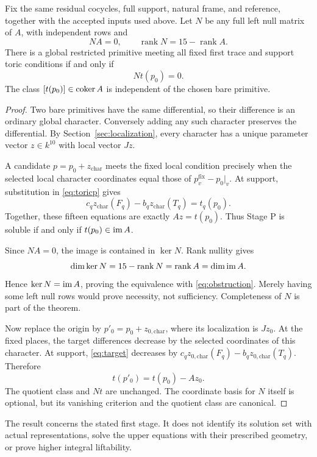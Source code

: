 \begin{theorem}\label{thm:affine}
Fix the same residual cocycles, full support, natural frame, and reference, together with the accepted inputs used above. Let $N$ be any full left null matrix of $A$, with independent rows and
\[
NA=0,\qquad\operatorname{rank}N=15-\operatorname{rank}A.
\]
There is a global restricted primitive meeting all fixed first trace and support toric conditions if and only if
\begin{equation}\label{eq:obstruction}
Nt(p_0)=0.
\end{equation}
The class $[t(p_0)]\in\operatorname{coker} A$ is independent of the chosen bare primitive.
\end{theorem}
\begin{proof}
Two bare primitives have the same differential, so their difference is an ordinary global character. Conversely adding any such character preserves the differential. By Section~\ref{sec:localization}, every character has a unique parameter vector $z\in k^{10}$ with local vector $Jz$.

A candidate $p=p_0+z_{\mathrm{char}}$ meets the fixed local condition precisely when the selected local character coordinates equal those of $p_v^{\mathrm{fix}}-p_0|_v$. At support, substitution in \eqref{eq:toricp} gives
\[
c_qz_{\mathrm{char}}(F_q)-b_qz_{\mathrm{char}}(T_q)=t_q(p_0).
\]
Together, these fifteen equations are exactly $Az=t(p_0)$. Thus Stage P is soluble if and only if $t(p_0)\in\operatorname{im} A$.

Since $NA=0$, the image is contained in $\ker N$. Rank nullity gives
\[
\dim\ker N=15-\operatorname{rank}N=\operatorname{rank}A=\dim\operatorname{im} A.
\]
Hence $\ker N=\operatorname{im} A$, proving the equivalence with \eqref{eq:obstruction}. Merely having some left null rows would prove necessity, not sufficiency. Completeness of $N$ is part of the theorem.

Now replace the origin by $p'_0=p_0+z_{0,\mathrm{char}}$, where its localization is $Jz_0$. At the fixed places, the target differences decrease by the selected coordinates of this character. At support, \eqref{eq:target} decreases by $c_qz_{0,\mathrm{char}}(F_q)-b_qz_{0,\mathrm{char}}(T_q)$. Therefore
\begin{equation}\label{eq:originshift}
t(p'_0)=t(p_0)-Az_0.
\end{equation}
The quotient class and $Nt$ are unchanged. The coordinate basis for $N$ itself is optional, but its vanishing criterion and the quotient class are canonical.
\end{proof}
The result concerns the stated first stage. It does not identify its solution set with actual representations, solve the upper equations with their prescribed geometry, or prove higher integral liftability.

